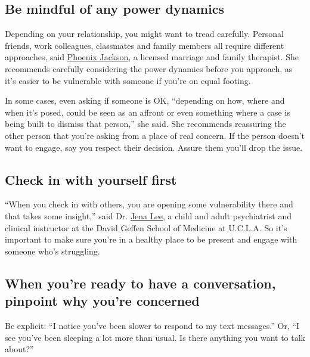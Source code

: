 \hypertarget{be-mindful-of-any-power-dynamics}{%
\subsection{Be mindful of any power
dynamics}\label{be-mindful-of-any-power-dynamics}}

Depending on your relationship, you might want to tread carefully.
Personal friends, work colleagues, classmates and family members all
require different approaches, said
\href{https://phoenixjacksontherapy.com/about}{Phoenix Jackson}, a
licensed marriage and family therapist. She recommends carefully
considering the power dynamics before you approach, as it's easier to be
vulnerable with someone if you're on equal footing.

In some cases, even asking if someone is OK, ``depending on how, where
and when it's posed, could be seen as an affront or even something where
a case is being built to dismiss that person,'' she said. She recommends
reassuring the other person that you're asking from a place of real
concern. If the person doesn't want to engage, say you respect their
decision. Assure them you'll drop the issue.

\hypertarget{check-in-with-yourself-first}{%
\subsection{Check in with yourself
first}\label{check-in-with-yourself-first}}

``When you check in with others, you are opening some vulnerability
there and that takes some insight,'' said Dr.
\href{https://www.semel.ucla.edu/autism/team/jena-lee-md}{Jena Lee}, a
child and adult psychiatrist and clinical instructor at the David Geffen
School of Medicine at U.C.L.A. So it's important to make sure you're in
a healthy place to be present and engage with someone who's struggling.

\hypertarget{when-youre-ready-to-have-a-conversation-pinpoint-why-youre-concerned}{%
\subsection{When you're ready to have a conversation, pinpoint why
you're
concerned}\label{when-youre-ready-to-have-a-conversation-pinpoint-why-youre-concerned}}

Be explicit: ``I notice you've been slower to respond to my text
messages.'' Or, ``I see you've been sleeping a lot more than usual. Is
there anything you want to talk about?''

